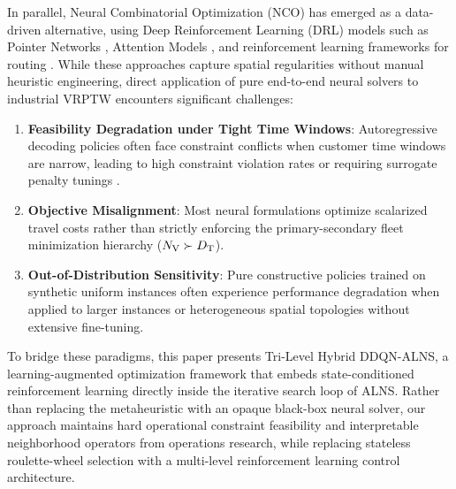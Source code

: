 In parallel, Neural Combinatorial Optimization (NCO) has emerged as a data-driven alternative, using Deep Reinforcement Learning (DRL) models such as Pointer Networks \cite{vinyals2015pointer}, Attention Models \cite{kool2019attention}, and reinforcement learning frameworks for routing \cite{nazari2018reinforcement}. While these approaches capture spatial regularities without manual heuristic engineering, direct application of pure end-to-end neural solvers to industrial VRPTW encounters significant challenges:
\begin{enumerate}
    \item \textbf{Feasibility Degradation under Tight Time Windows}: Autoregressive decoding policies often face constraint conflicts when customer time windows are narrow, leading to high constraint violation rates or requiring surrogate penalty tunings \cite{falkner2020learning, lin2021deep}.
    \item \textbf{Objective Misalignment}: Most neural formulations optimize scalarized travel costs rather than strictly enforcing the primary-secondary fleet minimization hierarchy (${N_\mathrm{V}} \succ {D_\mathrm{T}}$).
    \item \textbf{Out-of-Distribution Sensitivity}: Pure constructive policies trained on synthetic uniform instances often experience performance degradation when applied to larger instances or heterogeneous spatial topologies without extensive fine-tuning.
\end{enumerate}

To bridge these paradigms, this paper presents Tri-Level Hybrid DDQN-ALNS, a learning-augmented optimization framework that embeds state-conditioned reinforcement learning directly inside the iterative search loop of ALNS. Rather than replacing the metaheuristic with an opaque black-box neural solver, our approach maintains hard operational constraint feasibility and interpretable neighborhood operators from operations research, while replacing stateless roulette-wheel selection with a multi-level reinforcement learning control architecture. 

